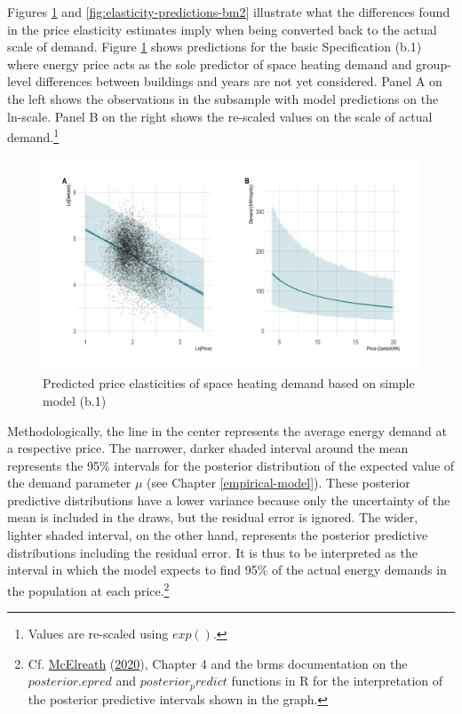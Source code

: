 \documentclass[12pt,twoside]{reedthesis}
\begin{document}
Figures \ref{fig:elasticity-predictions-b1} and \ref{fig:elasticity-predictions-bm2} illustrate what the differences found in the price elasticity estimates imply when being converted back to the actual scale of demand. Figure \ref{fig:elasticity-predictions-b1} shows predictions for the basic Specification (b.1) where energy price acts as the sole predictor of space heating demand and group-level differences between buildings and years are not yet considered. Panel A on the left shows the observations in the subsample with model predictions on the ln-scale. Panel B on the right shows the re-scaled values on the scale of actual demand.\footnote{Values are re-scaled using \(exp()\).}
\begin{figure}

{\centering \includegraphics[width=1\linewidth]{figure/b1_prediction} 

}

\caption{Predicted price elasticities of space heating demand based on simple model (b.1)}\label{fig:elasticity-predictions-b1}
\end{figure}
Methodologically, the line in the center represents the average energy demand at a respective price. The narrower, darker shaded interval around the mean represents the 95\% intervals for the posterior distribution of the expected value of the demand parameter \(\mu\) (see Chapter \ref{empirical-model}). These posterior predictive distributions have a lower variance because only the uncertainty of the mean is included in the draws, but the residual error is ignored. The wider, lighter shaded interval, on the other hand, represents the posterior predictive distributions including the residual error. It is thus to be interpreted as the interval in which the model expects to find 95\% of the actual energy demands in the population at each price.\footnote{Cf. \protect\hyperlink{ref-mcelreath20}{McElreath} (\protect\hyperlink{ref-mcelreath20}{2020}), Chapter 4 and the brms documentation on the \(posterior.epred\) and \(posterior_predict\) functions in R for the interpretation of the posterior predictive intervals shown in the graph.}
\end{document}
